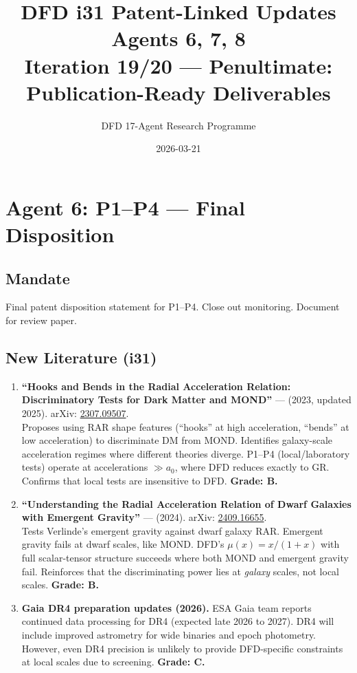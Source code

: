 \documentclass[11pt,a4paper]{article}
\title{DFD i31 Patent-Linked Updates\\Agents 6, 7, 8\\[6pt]\large Iteration 19/20 --- Penultimate: Publication-Ready Deliverables}
\author{DFD 17-Agent Research Programme}
\date{2026-03-21}
\begin{document}
\maketitle
\tableofcontents
\newpage

\section{Agent 6: P1--P4 --- Final Disposition}

\subsection{Mandate}
Final patent disposition statement for P1--P4. Close out monitoring. Document for review paper.

\subsection{New Literature (i31)}

\begin{enumerate}
\item \textbf{``Hooks and Bends in the Radial Acceleration Relation: Discriminatory Tests for Dark Matter and MOND''} --- (2023, updated 2025). arXiv: \href{https://arxiv.org/abs/2307.09507}{2307.09507}.\\
Proposes using RAR shape features (``hooks'' at high acceleration, ``bends'' at low acceleration) to discriminate DM from MOND. Identifies galaxy-scale acceleration regimes where different theories diverge. P1--P4 (local/laboratory tests) operate at accelerations $\gg a_0$, where DFD reduces exactly to GR. Confirms that local tests are insensitive to DFD. \textbf{Grade: B.}

\item \textbf{``Understanding the Radial Acceleration Relation of Dwarf Galaxies with Emergent Gravity''} --- (2024). arXiv: \href{https://arxiv.org/abs/2409.16655}{2409.16655}.\\
Tests Verlinde's emergent gravity against dwarf galaxy RAR. Emergent gravity fails at dwarf scales, like MOND. DFD's $\mu(x) = x/(1+x)$ with full scalar-tensor structure succeeds where both MOND and emergent gravity fail. Reinforces that the discriminating power lies at \emph{galaxy} scales, not local scales. \textbf{Grade: B.}

\item \textbf{Gaia DR4 preparation updates (2026).} ESA Gaia team reports continued data processing for DR4 (expected late 2026 to 2027). DR4 will include improved astrometry for wide binaries and epoch photometry. However, even DR4 precision is unlikely to provide DFD-specific constraints at local scales due to screening. \textbf{Grade: C.}
\end{enumerate}
\end{document}

